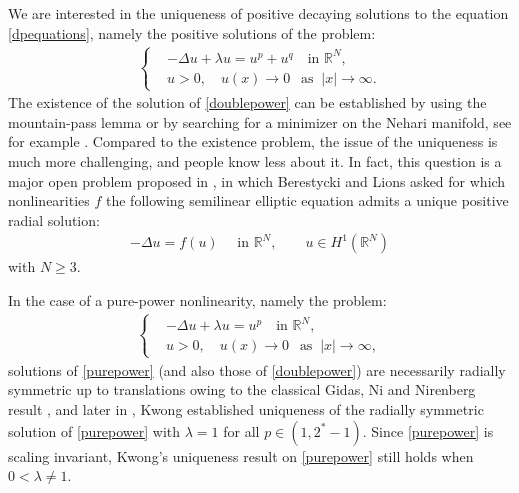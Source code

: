 \documentclass{article}
\theoremstyle{definition} \theoremstyle{remark}
\numberwithin{equation}{section}
\newcommand{\R}{\mathbb{R}}
\newcommand{\la}{\lambda}
\begin{document}
We are interested in the uniqueness of positive decaying solutions  to the equation \eqref{dpequations}, namely the positive solutions of the problem:
	\begin{align} \label{doublepower}
		\left\{
			\begin{aligned}
				& -\Delta u + \la u = u^{p} + u^{q} \quad \text{in } \R^N, \\
				& u > 0, \quad u(x) \to 0 ~~\text{ as }~ |x| \to \infty.
			\end{aligned}
		\right.
	\end{align}
The existence of the  solution of \eqref{doublepower} can be established by using the mountain-pass lemma or by searching for a minimizer on the Nehari manifold, see for example \cite{Wi}. Compared to the existence problem, the issue of the uniqueness is much more challenging, and people know less about it. In fact, this question  is a major open problem proposed in \cite[Section 10]{BL}, in which Berestycki and Lions asked for which nonlinearities $f$ the following semilinear elliptic equation admits a unique positive radial solution:
\begin{align*}
-\Delta u = f(u) \quad \text{ in } \R^N, \quad\quad u \in H^1(\R^N)
\end{align*}
with $N \ge 3$.





\vskip0.12in




In the case of a pure-power nonlinearity, namely the problem:
	\begin{align} \label{purepower}
		\left\{
			\begin{aligned}
				& -\Delta u + \la u = u^{p} \quad \text{in } \R^N, \\
				& u > 0, \quad u(x) \to 0 ~~\text{ as }~ |x| \to \infty,
			\end{aligned}
		\right.
	\end{align}
	solutions of \eqref{purepower} (and also those of \eqref{doublepower}) are necessarily radially symmetric up to translations owing to the classical Gidas, Ni and Nirenberg result \cite{GNN}, and later in \cite{Kwong}, Kwong established uniqueness of the radially symmetric solution of \eqref{purepower} with $\la = 1$ for all $p \in (1,2^*-1)$. Since \eqref{purepower} is scaling invariant, Kwong's uniqueness result on \eqref{purepower} still holds when $0 < \la \neq 1$.
\end{document}
